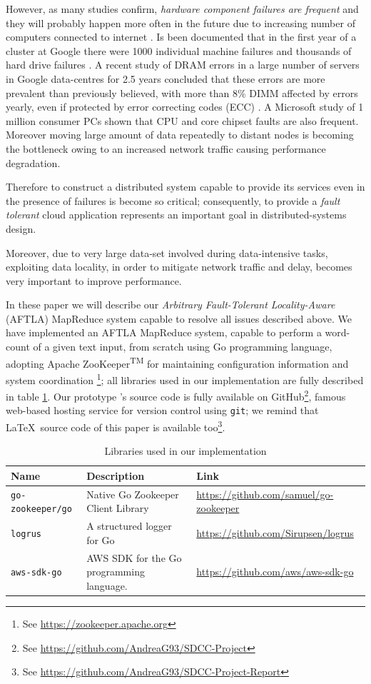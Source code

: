 \documentclass[sigchi]{acmart}
\begin{document}
However, as many studies confirm, \textit{hardware component failures are frequent} and they will probably happen more often in the future due to increasing number of computers connected to internet \citep{BFLMapReduce}. Is been documented that in the first year of a cluster at Google there were 1000 individual machine failures and thousands of hard drive failures \cite{PetaScaleFailure}. A recent study of DRAM errors in a large number of servers in Google data-centres for 2.5 years concluded that these errors are more prevalent than previously believed, with more than 8\% DIMM affected by errors yearly, even if protected by error correcting codes (ECC) \cite{DRAMError}. A Microsoft study of 1 million consumer PCs shown that CPU and core chipset faults are also frequent. \cite{MicrosoftStudyFailure} Moreover moving large amount of data repeatedly to distant nodes is becoming the bottleneck owing to an increased network traffic causing performance degradation.

Therefore to construct a distributed system capable to provide its services even in the presence of failures is become so critical; consequently, to provide a \textit{fault tolerant} cloud application represents an important goal in distributed-systems design. 

Moreover, due to very large data-set involved during data-intensive tasks, exploiting data locality, in order to mitigate network traffic and delay, becomes very important to improve performance.

In these paper we will describe our \textit{Arbitrary Fault-Tolerant Locality-Aware} (AFTLA) MapReduce system capable to resolve all issues described above. We have implemented an AFTLA MapReduce system, capable to perform a word-count of a given text input, from scratch using Go programming language, adopting Apache ZooKeeper\textsuperscript{TM} for maintaining configuration information and system coordination \footnote{See \url{https://zookeeper.apache.org}}; all libraries used in our implementation are fully described in table \ref{tab:libraries}. Our prototype    's source code is fully available on GitHub\footnote{See \url{https://github.com/AndreaG93/SDCC-Project}}, famous web-based hosting service for version control using \texttt{git}; we remind that \LaTeX\ source code of this paper is available too\footnote{See \url{https://github.com/AndreaG93/SDCC-Project-Report}}.  


\begin{table}
  \caption{Libraries used in our implementation}
  \label{tab:libraries}
  \begin{tabular}{l|l|l}
    \toprule
    Name & Description & Link \\
    \midrule
    \texttt{go-zookeeper/go} & Native Go Zookeeper Client Library & \url{https://github.com/samuel/go-zookeeper} \\
    \texttt{logrus} & A structured logger for Go & \url{https://github.com/Sirupsen/logrus} \\
    \texttt{aws-sdk-go} & AWS SDK for the Go programming language. & \url{https://github.com/aws/aws-sdk-go} \\
    \bottomrule
  \end{tabular}
\end{table}
\end{document}
